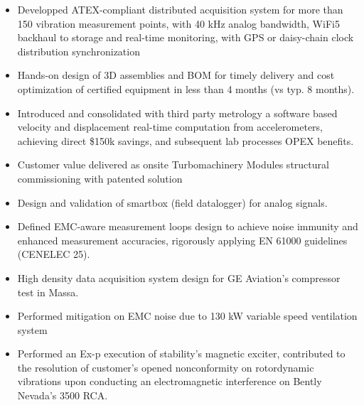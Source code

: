 \documentclass[9pt,a4paper,ragged2e,withhyper]{altacv} %
\begin{document}
\begin{paracol}{2}
\begin{itemize}
\item Developped ATEX-compliant distributed acquisition system for more than 150 vibration measurement points, 
with 40 kHz analog bandwidth, WiFi5 backhaul to storage and real-time monitoring, with GPS or daisy-chain clock distribution synchronization
\item Hands-on design of 3D assemblies and BOM for timely delivery and cost optimization of certified equipment in less than 4 months (vs typ. 8 months).
\item Introduced and consolidated with third party metrology a software based velocity and displacement real-time computation from accelerometers, achieving direct \$150k savings, and subsequent lab processes OPEX benefits.
\item Customer value delivered as onsite Turbomachinery Modules structural commissioning with patented solution
\end{itemize}
\divider

\begin{itemize}
\item Design and validation of smartbox (field datalogger) for analog signals. 
\item Defined EMC-aware measurement loops design to achieve noise immunity and enhanced measurement accuracies, 
rigorously applying EN 61000 guidelines (CENELEC 25).
\end{itemize}
\divider

\begin{itemize}
\item High density data acquisition system design for GE Aviation’s compressor test in Massa. 
\item Performed mitigation on EMC noise due to 130 kW variable speed ventilation system
\end{itemize}
\divider

\begin{itemize}
\item Performed an Ex-p execution of stability’s magnetic exciter, contributed to the
resolution of customer’s opened nonconformity on rotordynamic vibrations upon
conducting an electromagnetic interference on Bently Nevada's 3500 RCA.
\end{itemize}
\divider


\end{paracol}
\end{document}
